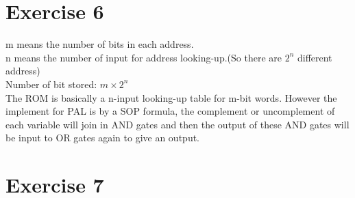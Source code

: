 \documentclass[10pt,twoside,a4paper]{article}
\begin{document}
\section*{Exercise 6}

m means the number of bits in each address.\\
n means the number of input for address looking-up.(So there are $2^n$ different address)\\
Number of bit stored: $m\times 2^n$\\
The ROM is basically a n-input looking-up table for m-bit words. However the implement for PAL is by a SOP formula, the complement or uncomplement of each variable will join in AND gates and then the output of these AND gates will be input to OR gates again to  give an output.

\section*{Exercise 7}
\end{document}
